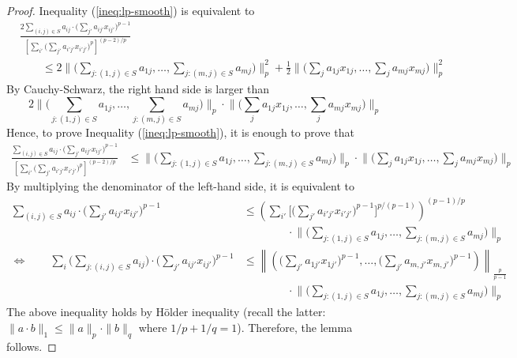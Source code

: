 \begin{proof}
Inequality (\ref{ineq:lp-smooth}) is equivalent to
\begin{align*}
&\frac{ 2\sum_{(i,j) \in S} a_{ij} \cdot \bigl( \sum_{j'} a_{ij'} x_{ij'} \bigr)^{p-1} }{ \left[ \sum_{i'} \bigl( \sum_{j'} a_{i'j'} x_{i'j'} \bigr)^{p} \right]^{(p-2)/p}} \\
& \qquad \leq 2 \biggl \| \biggl( \sum_{j: (1,j) \in S} a_{1j}, \ldots, \sum_{j: (m,j) \in S} a_{mj}  \biggr) \biggr\|_{p}^{2}
		+ \frac{1}{2} \biggl \| \biggl( \sum_{j} a_{1j} x_{1j}, \ldots, \sum_{j} a_{mj} x_{mj} \biggr) \biggr\|_{p}^{2}
\end{align*}
%
By Cauchy-Schwarz, the right hand side is larger than
$$
2\biggl \| \biggl( \sum_{j: (1,j) \in S} a_{1j}, \ldots, \sum_{j: (m,j) \in S} a_{mj}  \biggr) \biggr\|_{p}
	\cdot \biggl \| \biggl( \sum_{j} a_{1j} x_{1j}, \ldots, \sum_{j} a_{mj} x_{mj} \biggr) \biggr\|_{p}
$$
Hence, to prove Inequality (\ref{ineq:lp-smooth}), it is enough to prove that
%
\begin{align*}
\frac{\sum_{(i,j) \in S} a_{ij} \cdot \bigl( \sum_{j'} a_{ij'} x_{ij'} \bigr)^{p-1} }{ \left[ \sum_{i'} \bigl( \sum_{j'} a_{i'j'} x_{i'j'} \bigr)^{p} \right]^{(p-2)/p}}
&\leq \biggl \| \biggl( \sum_{j: (1,j) \in S} a_{1j}, \ldots, \sum_{j: (m,j) \in S} a_{mj}  \biggr) \biggr\|_{p}
	\cdot \biggl \| \biggl( \sum_{j} a_{1j} x_{1j}, \ldots, \sum_{j} a_{mj} x_{mj} \biggr) \biggr\|_{p}
\end{align*}
%
By multiplying the denominator of the left-hand side, it is equivalent to
%
\begin{align*}
    \sum_{(i,j) \in S} a_{ij} \cdot \bigl( \sum_{j'} a_{ij'} x_{ij'} \bigr)^{p-1} &\leq
        \left ( \sum_{i'} \biggl [ \biggl( \sum_{j'} a_{i'j'} x_{i'j'} \biggr)^{p-1} \biggr]^{p/(p-1)} \right)^{(p-1)/p} \\
            & \qquad \qquad \cdot \biggl \| \biggl( \sum_{j: (1,j) \in S} a_{1j}, \ldots, \sum_{j: (m,j) \in S} a_{mj}  \biggr) \biggr\|_{p} \\
%
\Longleftrightarrow \qquad
    \sum_{i} \biggl ( \sum_{j: (i,j) \in S} a_{ij} \biggr) \cdot \biggl( \sum_{j'} a_{ij'} x_{ij'} \biggr)^{p-1} &\leq
        \left \| \left( \biggl( \sum_{j'} a_{1j'} x_{1j'} \biggr)^{p-1}, \ldots, \biggl( \sum_{j'} a_{m,j'} x_{m,j'} \biggr)^{p-1} \right)   \right \|_{\frac{p}{p-1}}  \\
            & \qquad \qquad \cdot \biggl \| \biggl( \sum_{j: (1,j) \in S} a_{1j}, \ldots, \sum_{j: (m,j) \in S} a_{mj}  \biggr) \biggr\|_{p}
\end{align*}
The above inequality holds by H\"older inequality (recall the latter: $\| a \cdot b\|_{1} \leq \| a \|_{p} \cdot \| b \|_{q}$ where $1/p + 1/q = 1$).
Therefore, the lemma follows.
\end{proof}


